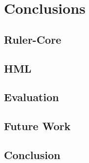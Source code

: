 \chapter{Conclusions}
\section{Ruler-Core}
\section{HML}
\section{Evaluation}
\section{Future Work}
\section{Conclusion}

